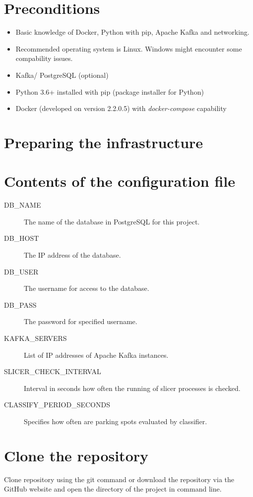 \documentclass[thesis=M,english]{FITthesis}[2019/03/06]
\begin{document}
\section{Preconditions}
\begin{itemize}
    \item Basic knowledge of Docker, Python with pip, Apache Kafka and networking.
    \item Recommended operating system is Linux. Windows might encounter some compability issues.
    \item Kafka/ PostgreSQL (optional)
    \item Python 3.6+ installed with pip (package installer for Python)
    \item Docker (developed on version 2.2.0.5) with \textit{docker-compose} capability
\end{itemize}


\section{Preparing the infrastructure}
\section{Contents of the configuration file}
\begin{description}
    \item [DB_NAME] The name of the database in PostgreSQL for this project.
    \item [DB_HOST] The IP address of the database.
    \item [DB_USER] The username for access to the database.
    \item [DB_PASS] The password for specified username.
    \item [KAFKA_SERVERS] List of IP addresses of Apache Kafka instances.
    \item [SLICER_CHECK_INTERVAL] Interval in seconds how often the running of slicer processes is checked.
    \item [CLASSIFY_PERIOD_SECONDS] Specifies how often are parking spots evaluated by classifier.
\end{description}


\section{Clone the repository}
Clone repository using the git command or download the repository via the GitHub website and open the directory of the project in command line.
\end{document}
